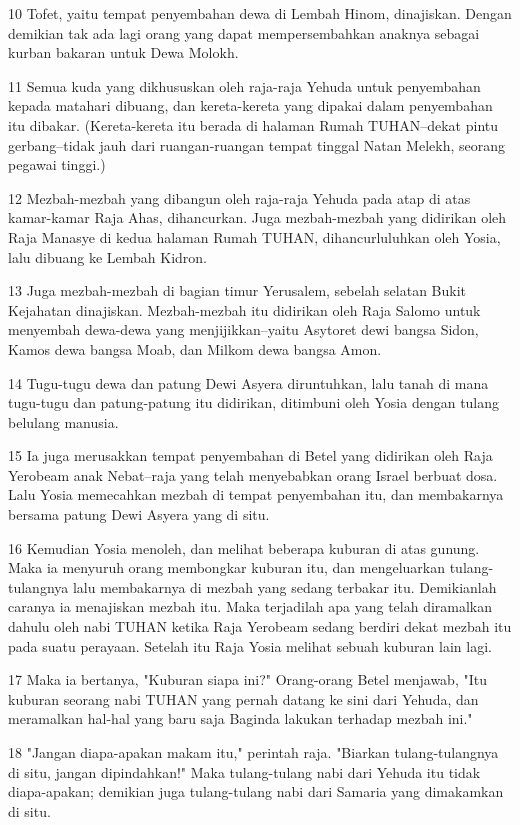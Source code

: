 \par 10 Tofet, yaitu tempat penyembahan dewa di Lembah Hinom, dinajiskan. Dengan demikian tak ada lagi orang yang dapat mempersembahkan anaknya sebagai kurban bakaran untuk Dewa Molokh.
\par 11 Semua kuda yang dikhususkan oleh raja-raja Yehuda untuk penyembahan kepada matahari dibuang, dan kereta-kereta yang dipakai dalam penyembahan itu dibakar. (Kereta-kereta itu berada di halaman Rumah TUHAN--dekat pintu gerbang--tidak jauh dari ruangan-ruangan tempat tinggal Natan Melekh, seorang pegawai tinggi.)
\par 12 Mezbah-mezbah yang dibangun oleh raja-raja Yehuda pada atap di atas kamar-kamar Raja Ahas, dihancurkan. Juga mezbah-mezbah yang didirikan oleh Raja Manasye di kedua halaman Rumah TUHAN, dihancurluluhkan oleh Yosia, lalu dibuang ke Lembah Kidron.
\par 13 Juga mezbah-mezbah di bagian timur Yerusalem, sebelah selatan Bukit Kejahatan dinajiskan. Mezbah-mezbah itu didirikan oleh Raja Salomo untuk menyembah dewa-dewa yang menjijikkan--yaitu Asytoret dewi bangsa Sidon, Kamos dewa bangsa Moab, dan Milkom dewa bangsa Amon.
\par 14 Tugu-tugu dewa dan patung Dewi Asyera diruntuhkan, lalu tanah di mana tugu-tugu dan patung-patung itu didirikan, ditimbuni oleh Yosia dengan tulang belulang manusia.
\par 15 Ia juga merusakkan tempat penyembahan di Betel yang didirikan oleh Raja Yerobeam anak Nebat--raja yang telah menyebabkan orang Israel berbuat dosa. Lalu Yosia memecahkan mezbah di tempat penyembahan itu, dan membakarnya bersama patung Dewi Asyera yang di situ.
\par 16 Kemudian Yosia menoleh, dan melihat beberapa kuburan di atas gunung. Maka ia menyuruh orang membongkar kuburan itu, dan mengeluarkan tulang-tulangnya lalu membakarnya di mezbah yang sedang terbakar itu. Demikianlah caranya ia menajiskan mezbah itu. Maka terjadilah apa yang telah diramalkan dahulu oleh nabi TUHAN ketika Raja Yerobeam sedang berdiri dekat mezbah itu pada suatu perayaan. Setelah itu Raja Yosia melihat sebuah kuburan lain lagi.
\par 17 Maka ia bertanya, "Kuburan siapa ini?" Orang-orang Betel menjawab, "Itu kuburan seorang nabi TUHAN yang pernah datang ke sini dari Yehuda, dan meramalkan hal-hal yang baru saja Baginda lakukan terhadap mezbah ini."
\par 18 "Jangan diapa-apakan makam itu," perintah raja. "Biarkan tulang-tulangnya di situ, jangan dipindahkan!" Maka tulang-tulang nabi dari Yehuda itu tidak diapa-apakan; demikian juga tulang-tulang nabi dari Samaria yang dimakamkan di situ.
